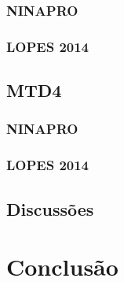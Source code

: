 \documentclass[
	12pt,				%
	openright,			%
	oneside,
	a4paper,			%
	english,			%
	francais,			%
	spanish,			%
	brazil				%
	]{abntex2}
\begin{document}
\subsection{NINAPRO}
\subsection{LOPES 2014}
\section{MTD4}
\subsection{NINAPRO}
\subsection{LOPES 2014}
\section{Discussões}

\chapter{Conclusão}

\postextual


\end{document}
